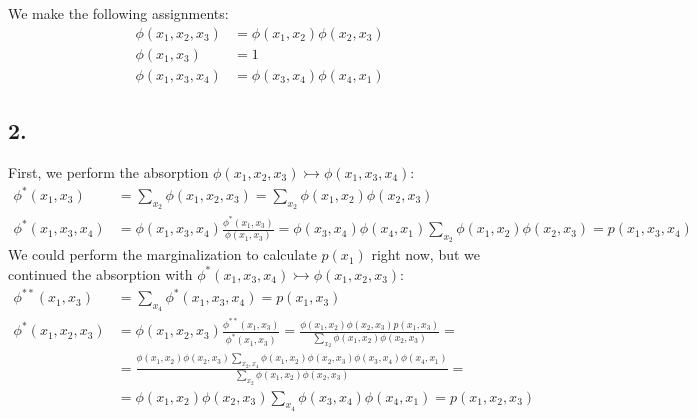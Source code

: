 \documentclass[11pt,a4paper,oneside]{report}
\begin{document}
We make the following assignments:
\begin{align*}
\phi(x_1,x_2,x_3) &= \phi(x_1,x_2)\phi(x_2,x_3)\\
\phi(x_1,x_3) &= 1\\
\phi(x_1,x_3,x_4) &= \phi(x_3,x_4)\phi(x_4,x_1)
\end{align*}

\subsection*{2.}

First, we perform the absorption $\phi(x_1,x_2,x_3)\rightarrowtail\phi(x_1,x_3,x_4)$:
\begin{align*}
\phi^\ast(x_1,x_3) &=\sum_{x_2}\phi(x_1,x_2,x_3)=\sum_{x_2}\phi(x_1,x_2)\phi(x_2,x_3) \\
\phi^\ast(x_1,x_3,x_4) &= \phi(x_1,x_3,x_4)\frac{\phi^\ast(x_1,x_3)}{\phi(x_1,x_3)}=\phi(x_3,x_4)\phi(x_4,x_1)\sum_{x_2}\phi(x_1,x_2)\phi(x_2,x_3)=p(x_1,x_3,x_4)
\end{align*}
We could perform the marginalization to calculate $p(x_1)$ right now, but we continued the absorption with $\phi^\ast(x_1,x_3,x_4)\rightarrowtail\phi(x_1,x_2,x_3)$:
\begin{align*}
\phi^{\ast\ast}(x_1,x_3) &=\sum_{x_4}\phi^\ast(x_1,x_3,x_4)=p(x_1,x_3) \\
\phi^\ast(x_1,x_2,x_3) &= \phi(x_1,x_2,x_3)\frac{\phi^{\ast\ast}(x_1,x_3)}{\phi^\ast(x_1,x_3)}=\frac{\phi(x_1,x_2)\phi(x_2,x_3)p(x_1,x_3)}{\sum_{x_2}\phi(x_1,x_2)\phi(x_2,x_3)}=\\
&=\frac{\phi(x_1,x_2)\phi(x_2,x_3)\sum_{x_2,x_4}\phi(x_1,x_2)\phi(x_2,x_3)\phi(x_3,x_4)\phi(x_4,x_1)}{\sum_{x_2}\phi(x_1,x_2)\phi(x_2,x_3)}=\\
&=\phi(x_1,x_2)\phi(x_2,x_3)\sum_{x_4}\phi(x_3,x_4)\phi(x_4,x_1)=p(x_1,x_2,x_3)
\end{align*}
\end{document}

